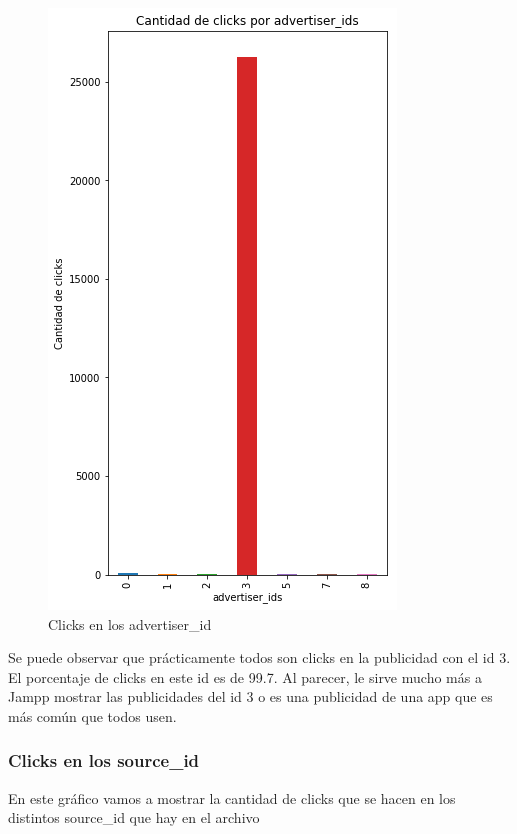 \documentclass[a4paper, 12pt]{article}
\newcommand\tab[1][1cm]{\hspace*{#1}}
\begin{document}
		\FloatBarrier
		\begin{figure}[h]
			\centering
			\includegraphics[scale=0.5]{images/clicks/clicks_advertiser_id.png}
			\caption{Clicks en los advertiser\_id}
		\end{figure}
		\FloatBarrier

		\tab Se puede observar que prácticamente todos son clicks en la publicidad con el id 3. El porcentaje de clicks en este id es de 99.7. Al parecer, le sirve mucho más a Jampp mostrar las publicidades del id 3 o es una publicidad de una app que es más común que todos usen.

	\subsubsection{Clicks en los source\_id}
		\tab En este gráfico vamos a mostrar la cantidad de clicks que se hacen en los distintos source\_id que hay en el archivo
		
\end{document}
